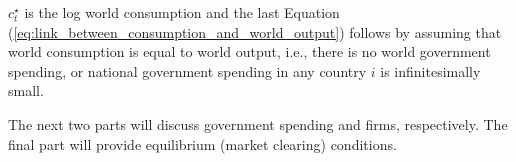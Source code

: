 $c_t^{\star}$ is the log world consumption and the last Equation (\ref{eq:link_between_consumption_and_world_output}) follows by assuming that world consumption is equal to world output, i.e., there is no world government spending, or national government spending in any country $i$ is infinitesimally small.

The next two parts will discuss government spending and firms, respectively. The final part will provide equilibrium (market clearing) conditions.
